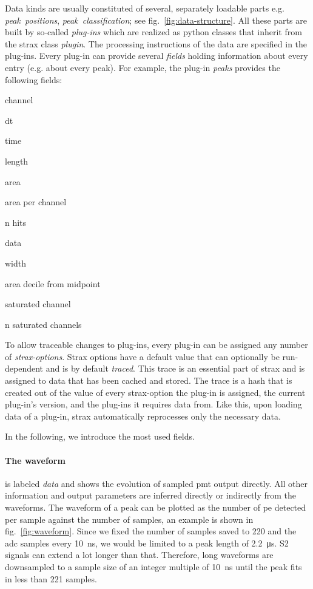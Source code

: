 Data kinds are usually constituted of several, separately loadable parts e.g. \emph{peak~positions}, \emph{peak~classification}; see fig.~\ref{fig:data-structure}.
All these parts are built by so-called \emph{plug-ins} which are realized as python classes that inherit from the strax class \emph{plugin}.
The processing instructions of the data are specified in the plug-ins.
Every plug-in can provide several \emph{fields} holding information about every entry (e.g. about every peak).
For example, the plug-in \emph{peaks} provides the following fields:
\begin{AutoMultiColItemize}
        \item{channel}
        \item{dt}
        \item{time}
        \item{length}
        \item{area}
        \item{area per channel}
        \item{n hits}
        \item{data}
        \item{width}
        \item{area decile from midpoint}
        \item{saturated channel}
        \item{n saturated channels}
\end{AutoMultiColItemize}
To allow traceable changes to plug-ins, every plug-in can be assigned any number of \emph{strax-options}.
Strax options have a default value that can optionally be run-dependent and is by default \emph{traced}.
This trace is an essential part of strax and is assigned to data that has been cached and stored.
The trace is a hash that is created out of the value of every strax-option the plug-in is assigned, the current plug-in's version, and the plug-ins it requires data from.
Like this, upon loading data of a plug-in, strax automatically reprocesses only the necessary data.



In the following, we introduce the most used fields.

\paragraph{The waveform} is labeled \emph{data} and shows the evolution of sampled \gls{pmt} output directly.
All other information and output parameters are inferred directly or indirectly from the waveforms.
The waveform of a peak can be plotted as the number of \gls{pe} detected per sample against the number of samples, an example is shown in fig.~\ref{fig:waveform}.
Since we fixed the number of samples saved to 220 and the \gls{adc} samples every \SI{10}{\nano\second}, we would be limited to a peak length of \SI{2.2}{\micro\second}.
S2 signals can extend a lot longer than that.
Therefore, long waveforms are downsampled to a sample size of an integer multiple of \SI{10}{\nano\second} until the peak fits in less than 221 samples.


